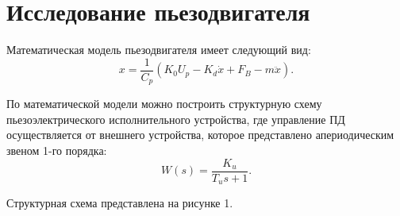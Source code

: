 \documentclass[a4paper, 12pt]{article}
\begin{document}
\section{Исследование пьезодвигателя}
\par 
Математическая модель пьезодвигателя имеет следующий вид:
\begin{equation}
	x = \frac{1}{C_p}(K_0U_p-K_d\dot{x}+F_B-m\ddot{x}).
\end{equation}
\par 
По математической модели можно построить структурную схему пьезоэлектрического исполнительного устройства, где управление ПД осуществляется от внешнего устройства, которое представлено апериодическим звеном 1-го порядка:
\begin{equation}
	W(s) = \displaystyle\frac{K_u}{T_us+1}.
\end{equation}
\par 
Структурная схема представлена на рисунке 1.
\end{document}
